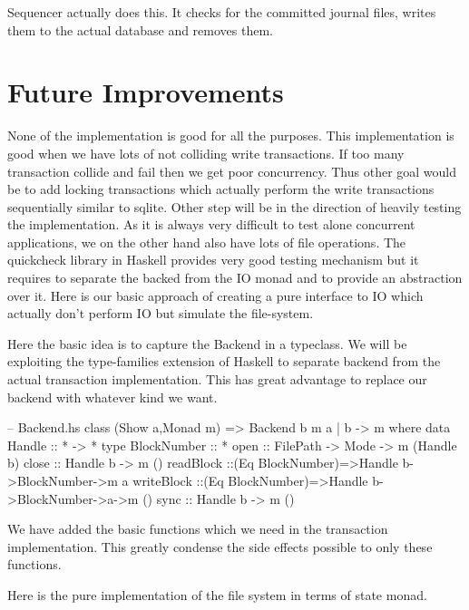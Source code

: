 \documentclass[11pt,a4paper]{article}
\begin{document}
Sequencer actually does this. It checks for the committed journal files, writes them to the actual database and removes them. 

\section{Future Improvements}
None of the implementation is good for all the purposes. This implementation is good when we have lots of not colliding write transactions. If too many transaction collide and fail then we get poor concurrency. Thus other goal would be to add locking transactions which actually perform the write transactions sequentially similar to sqlite. 
Other step will be in the direction of heavily testing the implementation. As it is always very difficult to test alone concurrent applications, we on the other hand also have lots of file operations. The quickcheck library in Haskell provides very good testing mechanism but it requires to separate the backed from the IO monad and to provide an abstraction over it.
Here is our basic approach of creating a pure interface to IO which actually don't perform IO but simulate the file-system. 

Here the basic idea is to capture the Backend in a typeclass. We will be exploiting the type-families extension of Haskell to separate backend from the actual transaction implementation. This has great advantage to replace our backend with whatever kind we want.

\begin{code}[name=Backend,firstnumber=1]
-- Backend.hs
class (Show a,Monad m) => Backend b m a | b -> m where 
    data Handle :: * -> * 
    type BlockNumber :: *  
    open :: FilePath -> Mode -> m (Handle b)
    close :: Handle b -> m () 
    readBlock ::(Eq BlockNumber)=>Handle b->BlockNumber->m a 
    writeBlock ::(Eq BlockNumber)=>Handle b->BlockNumber->a->m ()
    sync :: Handle b -> m ()
\end{code}

We have added the basic functions which we need in the transaction implementation. This greatly condense the side effects possible to only these functions.

Here is the pure implementation of the file system in terms of state monad. 

\end{document}
